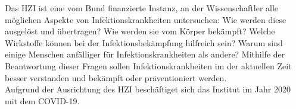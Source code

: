 Das \ac{HZI} ist eine vom Bund finanzierte Instanz, an der Wissenschaftler alle möglichen Aspekte von Infektionskrankheiten untersuchen:
Wie werden diese ausgelöst und übertragen?
Wie werden sie vom Körper bekämpft?
Welche Wirkstoffe können bei der Infektionsbekämpfung hilfreich sein?
Warum sind einige Menschen anfälliger für Infektionskrankheiten als andere?
Mithilfe der Beantwortung dieser Fragen sollen Infektionskrankheiten im der aktuellen Zeit besser verstanden und bekämpft oder präventioniert werden. 
\cite{HZI_about}
\\
Aufgrund der Ausrichtung des \ac{HZI} beschäftiget sich das Institut im Jahr 2020 mit dem \ac{COVID-19}.